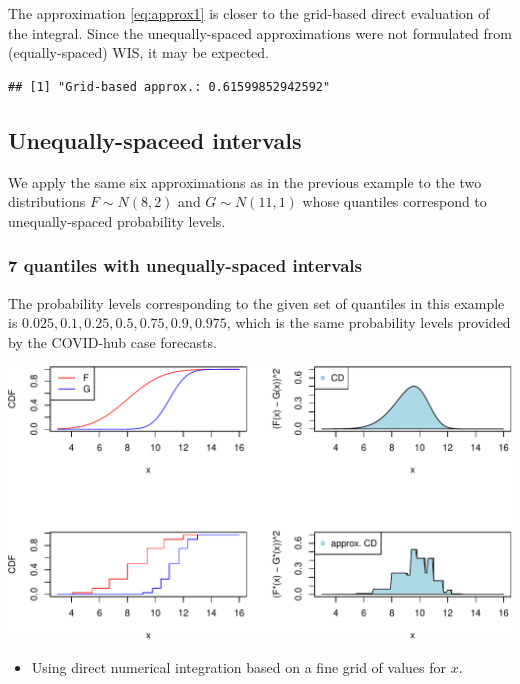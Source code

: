 \documentclass[
]{article}
\providecommand{\tightlist}{%
  \setlength{\itemsep}{0pt}\setlength{\parskip}{0pt}}
\begin{document}
The approximation \eqref{eq:approx1} is closer to the grid-based direct
evaluation of the integral. Since the unequally-spaced approximations
were not formulated from (equally-spaced) WIS, it may be expected.

\begin{verbatim}
## [1] "Grid-based approx.: 0.61599852942592"
\end{verbatim}

\hypertarget{unequally-spaceed-intervals}{%
\subsection{Unequally-spaceed
intervals}\label{unequally-spaceed-intervals}}

We apply the same six approximations as in the previous example to the
two distributions \(F\sim N(8,2)\) and \(G \sim N(11,1)\) whose
quantiles correspond to unequally-spaced probability levels.

\hypertarget{quantiles-with-unequally-spaced-intervals}{%
\subsubsection{7 quantiles with unequally-spaced
intervals}\label{quantiles-with-unequally-spaced-intervals}}

The probability levels corresponding to the given set of quantiles in
this example is \(0.025,0.1,0.25,0.5,0.75,0.9,0.975\), which is the same
probability levels provided by the COVID-hub case forecasts.

\includegraphics{cd_approx_2_files/figure-latex/unnamed-chunk-13-1.pdf}

\begin{itemize}
\tightlist
\item
  Using direct numerical integration based on a fine grid of values for
  \(x\).
\end{itemize}
\end{document}
